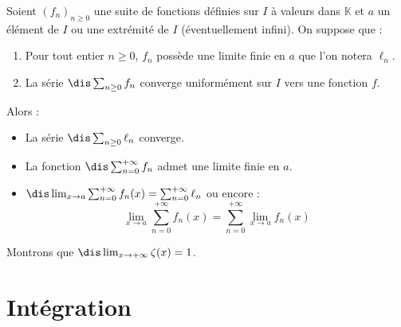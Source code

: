 \documentclass[a4paper,10pt]{report}
\begin{document}
\begin{thm}
\noindent Soient $(f_n)_{n \geq 0}$ une suite de fonctions définies sur $I$ à valeurs dans $\mathbb{K}$ et $a$ un élément de $I$ ou une extrémité de $I$ (éventuellement infini). On suppose que :

\begin{enumerate}
\item Pour tout entier $n \geq 0$, $f_n$ possède une limite finie en $a$ que l'on notera $\ell_n$.
\item La série $ \dis \sum_{ n \geq 0} f_n$ converge uniformément sur $I$ vers une fonction $f$.
\end{enumerate}
Alors :

\begin{itemize}
\item La série $ \dis \sum_{n \geq 0} \ell_n$ converge.
\item La fonction $\dis \sum_{n=0}^{+ \infty} f_n $ admet une limite finie en $a$.
\item $\dis \lim_{x \rightarrow a} \sum_{n=0}^{+ \infty} f_n(x) = \sum_{n=0}^{+ \infty} \ell_n$ ou encore :
$$  \lim_{x \rightarrow a} \sum_{n=0}^{+ \infty} f_n(x) = \sum_{n=0}^{+ \infty} \lim_{x \rightarrow a} f_n(x)$$
\end{itemize}
\end{thm}

\begin{ex} Montrons que $\dis \lim_{x \rightarrow + \infty} \zeta(x) = 1$.

%

\vspace{8cm}
\end{ex}

\section{Intégration}
\end{document}
